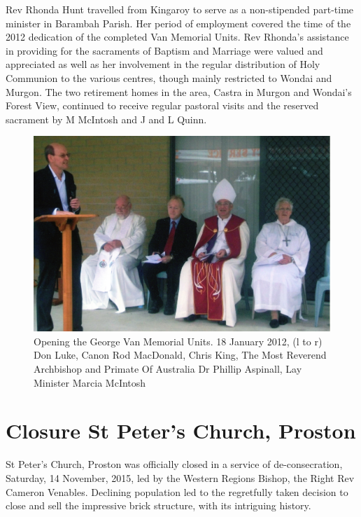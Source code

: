 Rev Rhonda Hunt travelled from Kingaroy to serve as a non-stipended part-time minister in Barambah Parish. Her period of employment covered the time of the 2012 dedication of the completed Van Memorial Units. Rev Rhonda's assistance in providing for the sacraments of Baptism and Marriage were valued and appreciated as well as her involvement in the regular distribution of Holy Communion to the various centres, though mainly restricted to Wondai and Murgon. The two retirement homes in the area, Castra in Murgon and Wondai's Forest View, continued to receive regular pastoral visits and the reserved sacrament by M McIntosh and J and L Quinn.









\begin{figure}[!htb]
\begin{center}
\includegraphics[width=1.\textwidth,center]{../images/openingGeorgeVannMemorialUnits.jpg}
\caption{Opening the George Van Memorial Units. 18 January 2012, (l to r) Don Luke, Canon Rod MacDonald, Chris King, The Most Reverend Archbishop and Primate Of Australia Dr Phillip Aspinall, Lay Minister Marcia McIntosh}
\end{center}
\end{figure}




\section{Closure St Peter's Church, Proston}



St Peter's Church, Proston was officially closed in a service of de-consecration, Saturday, 14 November, 2015, led by the Western Regions Bishop, the Right Rev Cameron Venables. Declining population led to the regretfully taken decision to close and sell the impressive brick structure, with its intriguing history.




